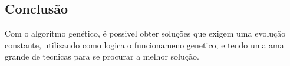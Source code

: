 \documentclass[a4paper,11pt]{article}
\begin{document}
\begin{multicols}{2}
\subsection{Conclusão}
Com o algoritmo genético, é possivel obter soluções que exigem uma evolução constante, utilizando como logica o funcionameno genetico, e tendo uma ama grande de tecnicas para se procurar a melhor solução.




\end{multicols}
\end{document}
